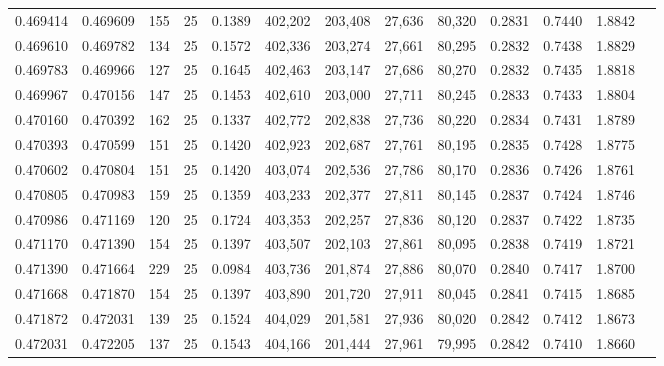 \begin{tabular}{rrrrrrrrrrrrr}
0.469414 & 0.469609 &   155 &  25 &                                     0.1389 & 402,202 & 203,408 &  27,636 &  80,320 & 0.2831 & 0.7440 & 1.8842 \\
0.469610 & 0.469782 &   134 &  25 &                                     0.1572 & 402,336 & 203,274 &  27,661 &  80,295 & 0.2832 & 0.7438 & 1.8829 \\
0.469783 & 0.469966 &   127 &  25 &                                     0.1645 & 402,463 & 203,147 &  27,686 &  80,270 & 0.2832 & 0.7435 & 1.8818 \\
0.469967 & 0.470156 &   147 &  25 &                                     0.1453 & 402,610 & 203,000 &  27,711 &  80,245 & 0.2833 & 0.7433 & 1.8804 \\
0.470160 & 0.470392 &   162 &  25 &                                     0.1337 & 402,772 & 202,838 &  27,736 &  80,220 & 0.2834 & 0.7431 & 1.8789 \\
0.470393 & 0.470599 &   151 &  25 &                                     0.1420 & 402,923 & 202,687 &  27,761 &  80,195 & 0.2835 & 0.7428 & 1.8775 \\
0.470602 & 0.470804 &   151 &  25 &                                     0.1420 & 403,074 & 202,536 &  27,786 &  80,170 & 0.2836 & 0.7426 & 1.8761 \\
0.470805 & 0.470983 &   159 &  25 &                                     0.1359 & 403,233 & 202,377 &  27,811 &  80,145 & 0.2837 & 0.7424 & 1.8746 \\
0.470986 & 0.471169 &   120 &  25 &                                     0.1724 & 403,353 & 202,257 &  27,836 &  80,120 & 0.2837 & 0.7422 & 1.8735 \\
0.471170 & 0.471390 &   154 &  25 &                                     0.1397 & 403,507 & 202,103 &  27,861 &  80,095 & 0.2838 & 0.7419 & 1.8721 \\
0.471390 & 0.471664 &   229 &  25 &                                     0.0984 & 403,736 & 201,874 &  27,886 &  80,070 & 0.2840 & 0.7417 & 1.8700 \\
0.471668 & 0.471870 &   154 &  25 &                                     0.1397 & 403,890 & 201,720 &  27,911 &  80,045 & 0.2841 & 0.7415 & 1.8685 \\
0.471872 & 0.472031 &   139 &  25 &                                     0.1524 & 404,029 & 201,581 &  27,936 &  80,020 & 0.2842 & 0.7412 & 1.8673 \\
0.472031 & 0.472205 &   137 &  25 &                                     0.1543 & 404,166 & 201,444 &  27,961 &  79,995 & 0.2842 & 0.7410 & 1.8660 \\

\end{tabular}
